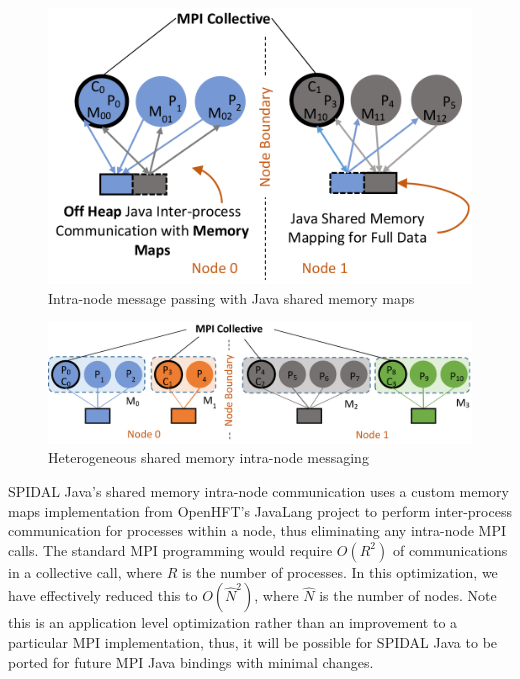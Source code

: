 \begin{figure}[!h]
\centering
\includegraphics[width=0.9\columnwidth]{figures/fig_mmap_intranode}
\caption{Intra-node message passing with Java shared memory maps}
\label{fig:fig_mmap_intranode}
\end{figure}

\begin{figure}[!h]
\centering
\includegraphics[width=0.9\columnwidth]{figures/fig_mmap_intranode_het}
\caption{Heterogeneous shared memory intra-node messaging}
\label{fig:fig_mmap_intranode_het}
\end{figure}

SPIDAL Java's shared memory intra-node communication uses a custom memory maps implementation from OpenHFT's JavaLang\cite{openhftjavalang} project to perform inter-process communication for processes within a node, thus eliminating any intra-node MPI calls. The standard MPI programming would require $O(R^2)$ of communications in a collective call, where $R$ is the number of processes. In this optimization, we have effectively reduced this to $O(\hat{N}^2)$, where $\hat{N}$ is the number of nodes. Note this is an application level optimization rather than an improvement to a particular MPI implementation, thus, it will be possible for SPIDAL Java to be ported for future MPI Java bindings with minimal changes.  

